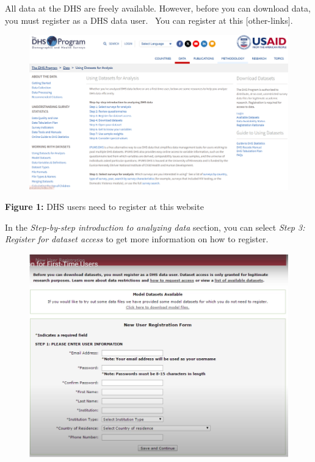 \documentclass[
  letterpaper,
  DIV=11,
  numbers=noendperiod]{scrreprt}
\begin{document}
All data at the DHS are freely available. However, before you can
download data, you must register as a DHS data user. ~You can register
at this {[}other-links{]}.

\begin{figure}

\includegraphics[width=5.41667in,height=\textheight]{plots/image_02.png} \hfill{}

\end{figure}

\textbf{Figure 1:} DHS users need to register at this website

In the \emph{Step-by-step introduction to analyzing data} section, you
can select \emph{Step 3:~ Register for dataset access} to get more
information on how to register.

\begin{figure}

\includegraphics[width=5.20833in,height=\textheight]{plots/image_03.png} \hfill{}

\end{figure}
\end{document}
